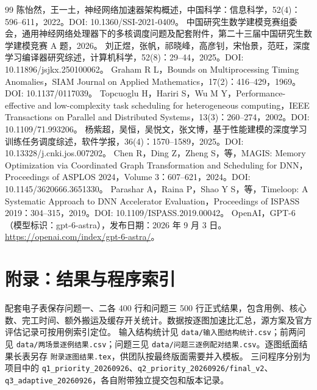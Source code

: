 \documentclass[UTF8,a4paper,zihao=-4]{ctexart}
\numberwithin{equation}{section}
\numberwithin{figure}{section}
\numberwithin{table}{section}
\begin{document}

\clearpage









\begin{thebibliography}{99}
 陈怡然，王一土，神经网络加速器架构概述，中国科学：信息科学，52(4)：596--611，2022。DOI: 10.1360/SSI-2021-0409。
 中国研究生数学建模竞赛组委会，通用神经网络处理器下的多核调度问题及配套附件，第二十三届中国研究生数学建模竞赛 A 题，2026。
 刘正煜，张帆，祁晓峰，高彦钊，宋怡景，范旺，深度学习编译器研究综述，计算机科学，52(8)：29--44，2025。DOI: 10.11896/jsjkx.250100062。
 Graham R L，Bounds on Multiprocessing Timing Anomalies，SIAM Journal on Applied Mathematics，17(2)：416--429，1969。DOI: 10.1137/0117039。
 Topcuoglu H，Hariri S，Wu M Y，Performance-effective and low-complexity task scheduling for heterogeneous computing，IEEE Transactions on Parallel and Distributed Systems，13(3)：260--274，2002。DOI: 10.1109/71.993206。
 杨紫超，吴恒，吴悦文，张文博，基于性能建模的深度学习训练任务调度综述，软件学报，36(4)：1570--1589，2025。DOI: 10.13328/j.cnki.jos.007202。
 Chen R，Ding Z，Zheng S，等，MAGIS: Memory Optimization via Coordinated Graph Transformation and Scheduling for DNN，Proceedings of ASPLOS 2024，Volume 3：607--621，2024。DOI: 10.1145/3620666.3651330。
 Parashar A，Raina P，Shao Y S，等，Timeloop: A Systematic Approach to DNN Accelerator Evaluation，Proceedings of ISPASS 2019：304--315，2019。DOI: 10.1109/ISPASS.2019.00042。
 OpenAI，GPT-6（模型标识：gpt-6-astra），发布日期：2026 年 9 月 3 日。\url{https://openai.com/index/gpt-6-astra/}。
\end{thebibliography}

\clearpage
\section*{附录：结果与程序索引}
配套电子表保存问题一、二各 400 行和问题三 500 行正式结果，包含用例、核心数、完工时间、额外搬运及缓存开关统计。数据按逐图加速比汇总，源方案及官方评估记录可按用例索引定位。
输入结构统计见 \texttt{data/输入图结构统计.csv}；前两问见 \texttt{data/两场景逐例结果.csv}；问题三见 \texttt{data/问题三逐例配对结果.csv}。逐图纸面结果长表另存 \texttt{附录逐图结果.tex}，供团队按最终版面需要并入模板。
三问程序分别为项目中的 \texttt{q1\_priority\_20260926}、\texttt{q2\_priority\_20260926/final\_v2}、\texttt{q3\_adaptive\_20260926}，各自附带独立提交包和版本记录。

\end{document}
